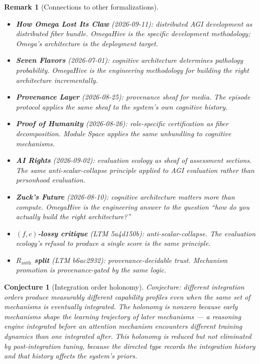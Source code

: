 \documentclass[11pt,a4paper]{article}
\newtheorem{conjecture}[definition]{Conjecture}
\newtheorem{remark}[definition]{Remark}
\begin{document}
\begin{remark}[Connections to other formalizations]
\begin{itemize}
\item \textbf{How Omega Lost Its Claw} (2026-09-11): distributed AGI
  development as distributed fiber bundle. OmegaHive is the specific
  development methodology; Omega's architecture is the deployment target.
\item \textbf{Seven Flavors} (2026-07-01): cognitive architecture
  determines pathology probability. OmegaHive is the engineering
  methodology for building the right architecture incrementally.
\item \textbf{Provenance Layer} (2026-08-25): provenance sheaf for media.
  The episode protocol applies the same sheaf to the system's own
  cognitive history.
\item \textbf{Proof of Humanity} (2026-08-26): role-specific certification
  as fiber decomposition. Module Space applies the same unbundling to
  cognitive mechanisms.
\item \textbf{AI Rights} (2026-09-02): evaluation ecology as sheaf of
  assessment sections. The same anti-scalar-collapse principle applied
  to AGI evaluation rather than personhood evaluation.
\item \textbf{Zuck's Future} (2026-08-10): cognitive architecture matters
  more than compute. OmegaHive is the engineering answer to the question
  ``how do you actually build the right architecture?''
\item \textbf{$(f,c)$-lossy critique} (LTM 5a4d150b): anti-scalar-collapse.
  The evaluation ecology's refusal to produce a single score is the same
  principle.
\item \textbf{$R_{\text{auth}}$ split} (LTM b6ac2932): provenance-decidable
  trust. Mechanism promotion is provenance-gated by the same logic.
\end{itemize}
\end{remark}

\begin{conjecture}[Integration order holonomy]
Conjecture: different integration orders produce measurably different
capability profiles even when the same set of mechanisms is eventually
integrated. The holonomy is nonzero because early mechanisms shape the
learning trajectory of later mechanisms --- a reasoning engine integrated
before an attention mechanism encounters different training dynamics than
one integrated after. This holonomy is reduced but not eliminated by
post-integration tuning, because the directed type records the
integration history and that history affects the system's priors.
\end{conjecture}
\end{document}
